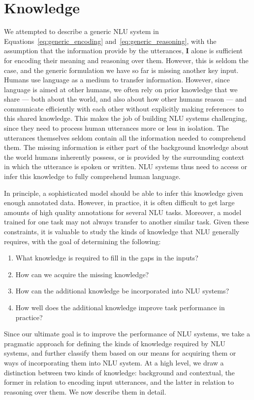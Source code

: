 \section{Knowledge}\label{sec:intro_external_knowledge}
We attempted to describe a generic NLU system in Equations~\ref{eq:generic_encoding} and~\ref{eq:generic_reasoning}, with the assumption that the
information provide by the utterances, $\textbf{I}$ alone is sufficient for encoding their meaning and reasoning over them. However, this is seldom the case, and the generic formulation we have so far is missing another key input.
Humans use language as a medium to transfer information. However, since language is aimed at other humans, we often rely on prior 
knowledge that we share --- both about the world, and also about how other humans reason --- and communicate efficiently with each other without explicitly
making references to this shared knowledge. This makes the job of building NLU systems challenging, since they need to process human utterances more or less
in isolation. The utterances themselves seldom contain all the information needed to comprehend them. The missing information is either part of the background
knowledge about the world humans inherently possess, or is provided by the surrounding context in which the utterance is spoken or written. NLU systems thus
need to access or infer this knowledge to fully comprehend human language.

In principle, a sophisticated model should be able to infer this knowledge given enough annotated data. However, in practice, it is often difficult to
get large amounts of high quality annotations for several NLU tasks. Moreover, a model trained for one task may not always transfer to another similar
task. Given these constraints, it is valuable to study the kinds of knowledge that NLU generally requires, with the goal of determining the following:
\begin{enumerate}
\item What knowledge is required to fill in the gaps in the inputs?
\item How can we acquire the missing knowledge?
\item How can the additional knowledge be incorporated into NLU systems?
\item How well does the additional knowledge improve task performance in practice?
\end{enumerate}

Since our ultimate goal is to improve the performance of NLU systems, we take a pragmatic approach for defining the kinds of knowledge required
by NLU systems, and further classify them based on our means for acquiring them or ways of incorporating them into NLU system.
At a high level, we draw a distinction between two kinds of knowledge: background and contextual, the former in relation to encoding input utterances, and the latter in relation to
reasoning over them. We now describe them in detail.

